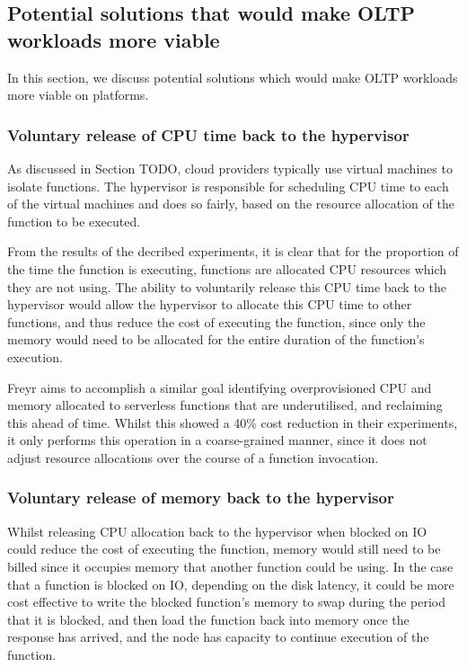 \subsection{Potential solutions that would make OLTP workloads more viable}
In this section, we discuss potential solutions which would make OLTP workloads more viable on \faas{} platforms.

\subsubsection{Voluntary release of CPU time back to the hypervisor}
As discussed in Section TODO, cloud providers typically use virtual machines to isolate functions. The hypervisor is responsible for scheduling CPU time to each of the virtual machines and does so fairly, based on the resource allocation of the function to be executed.

From the results of the decribed experiments, it is clear that for the proportion of the time the function is executing, functions are allocated CPU resources which they are not using. The ability to voluntarily release this CPU time back to the hypervisor would allow the hypervisor to allocate this CPU time to other functions, and thus reduce the cost of executing the function, since only the memory would need to be allocated for the entire duration of the function's execution.

Freyr aims to accomplish a similar goal identifying overprovisioned CPU and memory allocated to serverless functions \cite{yuAcceleratingServerlessComputing2022} that are underutilised, and reclaiming this ahead of time. Whilst this showed a 40\% cost reduction in their experiments, it only performs this operation in a coarse-grained manner, since it does not adjust resource allocations over the course of a function invocation.

\subsubsection{Voluntary release of memory back to the hypervisor}
Whilst releasing CPU allocation back to the hypervisor when blocked on IO could reduce the cost of executing the function, memory would still need to be billed since it occupies memory that another function could be using. In the case that a function is blocked on IO, depending on the disk latency, it could be more cost effective to write the blocked function's memory to swap during the period that it is blocked, and then load the function back into memory once the response has arrived, and the node has capacity to continue execution of the function.


